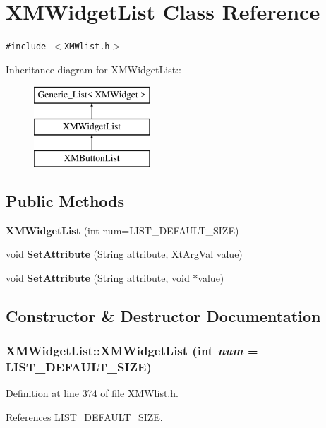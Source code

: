 \section{XMWidget\-List  Class Reference}
\label{classXMWidgetList}
{\tt \#include $<$XMWlist.h$>$}

Inheritance diagram for XMWidget\-List::\begin{figure}[H]
\begin{center}
\leavevmode
\includegraphics[height=3cm]{classXMWidgetList}
\end{center}
\end{figure}
\subsection*{Public Methods}
\begin{CompactItemize}
\item 
{\bf XMWidget\-List} (int num=LIST\_\-DEFAULT\_\-SIZE)
\item 
void {\bf Set\-Attribute} (String attribute, Xt\-Arg\-Val value)
\item 
void {\bf Set\-Attribute} (String attribute, void $\ast$value)
\end{CompactItemize}


\subsection{Constructor \& Destructor Documentation}
\subsubsection{\setlength{\rightskip}{0pt plus 5cm}XMWidget\-List::XMWidget\-List (int {\em num} = LIST\_\-DEFAULT\_\-SIZE)\hspace{0.3cm}{\tt  [inline]}}\label{classXMWidgetList_a0}




Definition at line 374 of file XMWlist.h.

References LIST\_\-DEFAULT\_\-SIZE.

